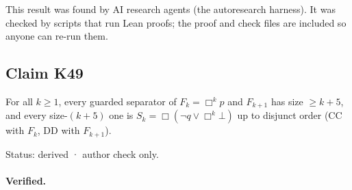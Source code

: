 \documentclass{article}
\begin{document}
This result was found by AI research agents (the autoresearch harness). It was checked by scripts that run Lean proofs; the proof and check files are included so anyone can re-run them.

\subsection*{Claim K49}

For all $k\ge1$, every guarded separator of $F_k=\Box^kp$ and $F_{k+1}$ has size $\ge k+5$, and every size-$(k+5)$ one is $S_k=\Box(\neg q\vee\Box^k\bot)$ up to disjunct order (CC with $F_k$, DD with $F_{k+1}$).

Status: derived · author check only.

\paragraph{Verified.}
\end{document}
